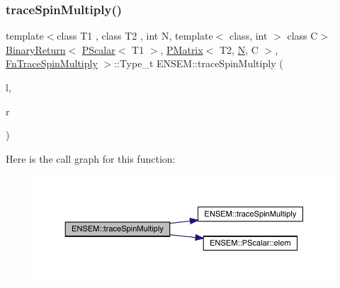 \subsubsection{\texorpdfstring{traceSpinMultiply()}{traceSpinMultiply()}\hspace{0.1cm}{\footnotesize\ttfamily [3/3]}}
{\footnotesize\ttfamily template$<$class T1 , class T2 , int N, template$<$ class, int $>$ class C$>$ \\
\mbox{\hyperlink{structENSEM_1_1BinaryReturn}{Binary\+Return}}$<$ \mbox{\hyperlink{classENSEM_1_1PScalar}{P\+Scalar}}$<$ T1 $>$, \mbox{\hyperlink{classENSEM_1_1PMatrix}{P\+Matrix}}$<$ T2, \mbox{\hyperlink{adat__devel_2lib_2hadron_2operator__name__util_8cc_a7722c8ecbb62d99aee7ce68b1752f337}{N}}, C $>$, \mbox{\hyperlink{structENSEM_1_1FnTraceSpinMultiply}{Fn\+Trace\+Spin\+Multiply}} $>$\+::Type\+\_\+t E\+N\+S\+E\+M\+::trace\+Spin\+Multiply (\begin{DoxyParamCaption}\item[{const \mbox{\hyperlink{classENSEM_1_1PScalar}{P\+Scalar}}$<$ T1 $>$ \&}]{l,  }\item[{const \mbox{\hyperlink{classENSEM_1_1PMatrix}{P\+Matrix}}$<$ T2, \mbox{\hyperlink{adat__devel_2lib_2hadron_2operator__name__util_8cc_a7722c8ecbb62d99aee7ce68b1752f337}{N}}, C $>$ \&}]{r }\end{DoxyParamCaption})\hspace{0.3cm}{\ttfamily [inline]}}

Here is the call graph for this function\+:\nopagebreak
\begin{figure}[H]
\begin{center}
\leavevmode
\includegraphics[width=350pt]{df/d0a/group__primmatrix_gafb9febbc048f38bb6e1dc7d60d8dde8d_cgraph}
\end{center}
\end{figure}
\mbox{\label{group__primmatrix_gaffe281aeb23abb6d655321654f855e26}} 
